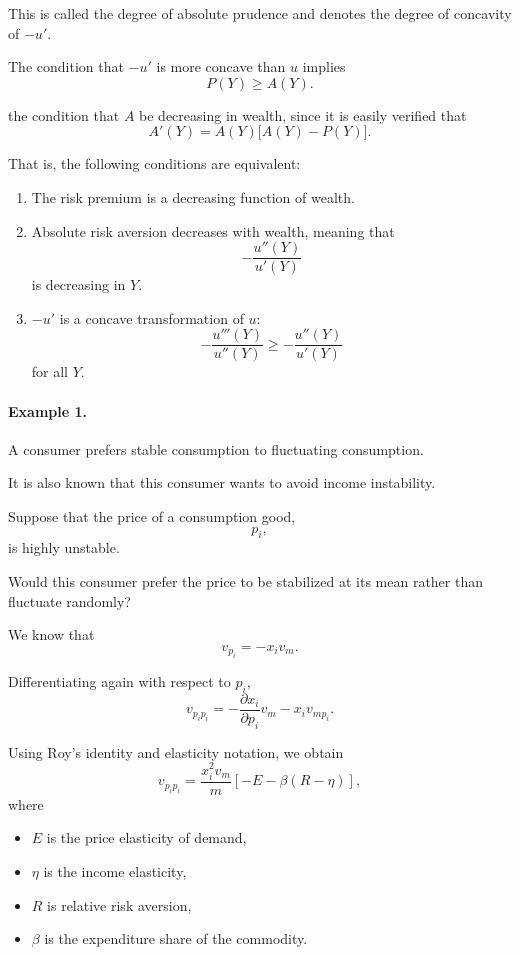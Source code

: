 This is called the degree of absolute prudence and denotes the degree of concavity of \(-u'\).

The condition that \(-u'\) is more concave than \(u\) implies
\[
P(Y)\ge A(Y).
\]




the condition that \(A\) be decreasing in wealth, since it is easily verified that
\[
A'(Y)
=
A(Y)\bigl[A(Y)-P(Y)\bigr].
\]

That is, the following conditions are equivalent:

\begin{enumerate}
    \item The risk premium is a decreasing function of wealth.
    
    \item Absolute risk aversion decreases with wealth, meaning that
    \[
    -\frac{u''(Y)}{u'(Y)}
    \]
    is decreasing in \(Y\).
    
    \item \(-u'\) is a concave transformation of \(u\):
    \[
    -\frac{u'''(Y)}{u''(Y)}
    \ge
    -\frac{u''(Y)}{u'(Y)}
    \]
    for all \(Y\).
\end{enumerate}

\paragraph{Example 1.}

A consumer prefers stable consumption to fluctuating consumption.

It is also known that this consumer wants to avoid income instability.

Suppose that the price of a consumption good,
\[
p_i,
\]
is highly unstable.

Would this consumer prefer the price to be stabilized at its mean rather than fluctuate randomly?

We know that
\[
v_{p_i}
=
-x_i v_m.
\]

Differentiating again with respect to \(p_i\),
\[
v_{p_ip_i}
=
-\frac{\partial x_i}{\partial p_i}v_m
-
x_i v_{mp_i}.
\]

Using Roy's identity and elasticity notation, we obtain
\[
v_{p_ip_i}
=
\frac{x_i^2v_m}{m}
\left[
-E-\beta(R-\eta)
\right],
\]
where

\begin{itemize}
    \item \(E\) is the price elasticity of demand,
    \item \(\eta\) is the income elasticity,
    \item \(R\) is relative risk aversion,
    \item \(\beta\) is the expenditure share of the commodity.
\end{itemize}

